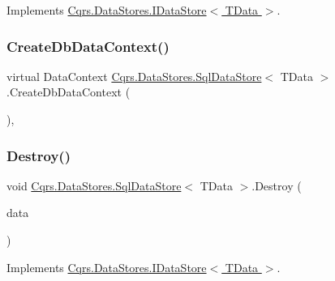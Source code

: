 Implements \hyperlink{interfaceCqrs_1_1DataStores_1_1IDataStore_a906f3f2f80db7a549a4170eca4653e26_a906f3f2f80db7a549a4170eca4653e26}{Cqrs.\+Data\+Stores.\+I\+Data\+Store$<$ T\+Data $>$}.

\mbox{\label{classCqrs_1_1DataStores_1_1SqlDataStore_a8458af970314deef8eff6a4783b1c46f_a8458af970314deef8eff6a4783b1c46f}} 
\subsubsection{\texorpdfstring{Create\+Db\+Data\+Context()}{CreateDbDataContext()}}
{\footnotesize\ttfamily virtual Data\+Context \hyperlink{classCqrs_1_1DataStores_1_1SqlDataStore}{Cqrs.\+Data\+Stores.\+Sql\+Data\+Store}$<$ T\+Data $>$.Create\+Db\+Data\+Context (\begin{DoxyParamCaption}{ }\end{DoxyParamCaption})\hspace{0.3cm}{\ttfamily [protected]}, {\ttfamily [virtual]}}

\mbox{\label{classCqrs_1_1DataStores_1_1SqlDataStore_a5ec396c9eb202c8de931c1546c721ca3_a5ec396c9eb202c8de931c1546c721ca3}} 
\subsubsection{\texorpdfstring{Destroy()}{Destroy()}}
{\footnotesize\ttfamily void \hyperlink{classCqrs_1_1DataStores_1_1SqlDataStore}{Cqrs.\+Data\+Stores.\+Sql\+Data\+Store}$<$ T\+Data $>$.Destroy (\begin{DoxyParamCaption}\item[{T\+Data}]{data }\end{DoxyParamCaption})}



Implements \hyperlink{interfaceCqrs_1_1DataStores_1_1IDataStore_aa7ade96f2f3151d5353cf7bdbb2baec5_aa7ade96f2f3151d5353cf7bdbb2baec5}{Cqrs.\+Data\+Stores.\+I\+Data\+Store$<$ T\+Data $>$}.

